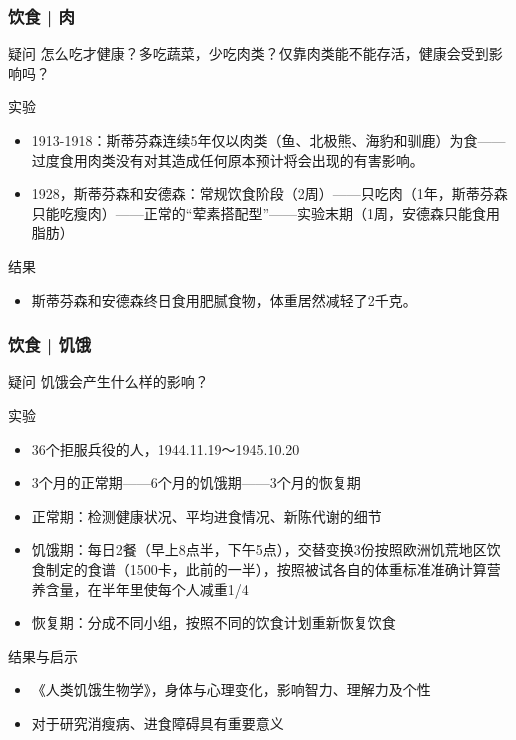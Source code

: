 \begin{frame}
  \frametitle{饮食 | 肉}
  \begin{block}{疑问}
    怎么吃才健康？多吃蔬菜，少吃肉类？仅靠肉类能不能存活，健康会受到影响吗？
  \end{block}
  \pause
  \begin{block}{实验}
    \begin{itemize}
      \item 1913-1918：斯蒂芬森连续5年仅以肉类（鱼、北极熊、海豹和驯鹿）为食——过度食用肉类没有对其造成任何原本预计将会出现的有害影响。
      \item 1928，斯蒂芬森和安德森：常规饮食阶段（2周）——只吃肉（1年，斯蒂芬森只能吃瘦肉）——正常的“荤素搭配型”——实验末期（1周，安德森只能食用脂肪）
    \end{itemize}
  \end{block}
  \pause
  \begin{block}{结果}
    \begin{itemize}
      \item 斯蒂芬森和安德森终日食用肥腻食物，体重居然减轻了2千克。
    \end{itemize}
  \end{block}
\end{frame}

\begin{frame}
  \frametitle{饮食 | 饥饿}
  \vspace{-0.5em}
  \begin{block}{疑问}
    饥饿会产生什么样的影响？
  \end{block}
  \vspace{-0.5em}
  \pause
  \begin{block}{实验}
    \begin{itemize}
      \item 36个拒服兵役的人，1944.11.19～1945.10.20
      \item 3个月的正常期——6个月的饥饿期——3个月的恢复期
      \item 正常期：检测健康状况、平均进食情况、新陈代谢的细节
      \item 饥饿期：每日2餐（早上8点半，下午5点），交替变换3份按照欧洲饥荒地区饮食制定的食谱（1500卡，此前的一半），按照被试各自的体重标准准确计算营养含量，在半年里使每个人减重1/4
      \item 恢复期：分成不同小组，按照不同的饮食计划重新恢复饮食
    \end{itemize}
  \end{block}
  \vspace{-0.5em}
  \pause
  \begin{block}{结果与启示}
    \begin{itemize}
      \item 《人类饥饿生物学》，身体与心理变化，影响智力、理解力及个性
      \item 对于研究消瘦病、进食障碍具有重要意义
    \end{itemize}
  \end{block}
\end{frame}

